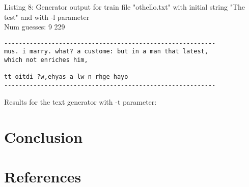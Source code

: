 \documentclass{article}
\begin{document}
Listing 8: Generator output for train file "othello.txt" with initial string "The test" and with -l parameter
\\Num guesses: 9 229

\begin{lstlisting}
----------------------------------------------------------
mus. i marry. what? a custome: but in a man that latest, 
which not enriches him,

tt oitdi ?w,ehyas a lw n rhge hayo
----------------------------------------------------------
\end{lstlisting}



Results for the text generator with -t parameter:


\hfill

    

\section{Conclusion}
\label{sec:conclusion}


\section{References}


\end{document}
